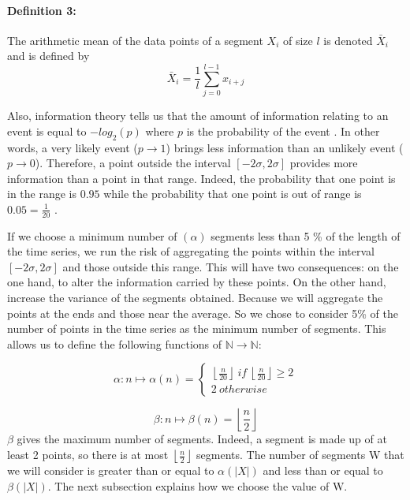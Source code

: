 \paragraph{Definition 3:} The arithmetic mean of the data points of a segment $ X_{i} $ of size $ l $ is
denoted $ \bar {X}_{i} $ and is defined by
\[
\bar{X}_{i} = \frac{1}{l} \sum_{j = 0}^{l-1} x_{i + j}
\]




Also, information theory tells us that the amount of information relating to an event is equal to $ -log_{2}(p) $ where $ p $ is the probability of the event
\cite{Shannon2001} . In other words, a very likely event ($ p \longrightarrow1 $) brings less information than an unlikely event ($ p \longrightarrow0 $). Therefore, a point outside the interval $ [- 2 \sigma, 2 \sigma] $ provides more information than a point in that range. Indeed, the probability that one point is in the range is $ 0.95$ while the probability that one point is out of range is $ 0.05 = \frac{1}{20} $ .


If we choose a minimum number of $ (\alpha) $ segments less than 5 \% of the length of the time series, we run the risk of aggregating the points within the interval $ [- 2 \sigma, 2 \sigma] $ and those outside this range. This will have two consequences: on the one hand, to alter the information carried by these points. On the other hand, increase the variance of the segments obtained. Because we will aggregate the points at the ends and those near the average. So we chose to  consider 5\% of the number of points in the time series as the minimum number of segments. This allows us to define the following functions of $ \mathbb{N} \rightarrow \mathbb{N} $:

\[
\alpha: n \mapsto \alpha(n) = \left \{
\begin{array}{c}
\left \lfloor \frac{n}{20} \right \rfloor \: if \: \left \lfloor \frac{n}{20} \right \rfloor \geq 2 \\
2 \: otherwise
\end{array} 
\right.
\]



\[
\beta: n \mapsto \beta(n) = \left \lfloor \frac{n}{2} \right \rfloor
\]
 $ \beta $ gives the maximum number of segments. Indeed, a segment is made up of at least 2 points, so there is at most $ \left \lfloor
\frac{n}{2} \right \rfloor $ segments. The number of segments W that we will consider is greater than or equal to $ \alpha (| X |) $ and less than or equal to $ \beta (| X |) $. The next subsection explains how we choose the value of W.

